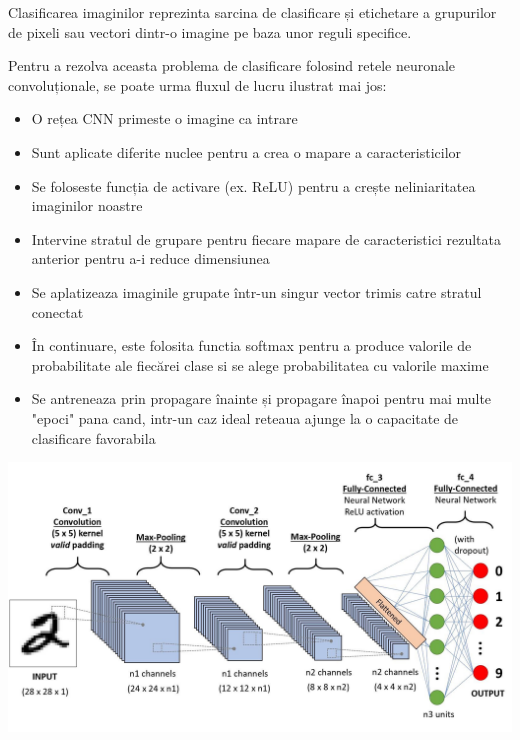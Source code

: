 \documentclass[10pt]{article}
\begin{document}
\> Clasificarea imaginilor reprezinta sarcina de clasificare și etichetare a grupurilor de pixeli sau vectori dintr-o imagine pe baza unor reguli specifice.

\> Pentru a rezolva aceasta problema de clasificare folosind retele neuronale convoluționale, se poate urma fluxul de lucru ilustrat mai jos:

\begin{itemize}

  \item O rețea CNN primeste o imagine ca intrare
  \item Sunt aplicate diferite nuclee pentru a crea o mapare a caracteristicilor
  \item Se foloseste funcția de activare (ex. ReLU) pentru a crește neliniaritatea imaginilor noastre
  \item Intervine stratul de grupare pentru fiecare mapare de caracteristici rezultata anterior pentru a-i reduce dimensiunea
  \item Se aplatizeaza imaginile grupate într-un singur vector trimis catre stratul conectat
  \item În continuare, este folosita functia softmax pentru a produce valorile de probabilitate ale fiecărei clase si se alege probabilitatea cu valorile maxime
  \item Se antreneaza prin propagare înainte și propagare înapoi pentru mai multe "epoci" pana cand, intr-un caz ideal reteaua ajunge la o capacitate de clasificare favorabila

\end{itemize}


\begin{center}

  \includegraphics[scale=0.2]{proces-clasificare-cnn}
  
\end{center}
\end{document}
